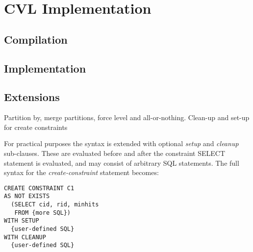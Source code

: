 \section{CVL Implementation}
\label{sec:implementation}

\subsection{Compilation}

\subsection{Implementation}

\subsection{Extensions}

Partition by, merge partitions, force level and all-or-nothing. Clean-up and set-up for create constraints

For practical purposes the syntax is extended with optional \emph{setup} and \emph{cleanup} sub-clauses. These are evaluated before and after the constraint SELECT statement is evaluated, and may consist of arbitrary SQL statements. The full syntax for the \emph{create-constraint} statement becomes:

\begin{lstlisting}
CREATE CONSTRAINT C1 
AS NOT EXISTS
  (SELECT cid, rid, minhits
   FROM {more SQL})
WITH SETUP
  {user-defined SQL}
WITH CLEANUP
  {user-defined SQL}
\end{lstlisting}

